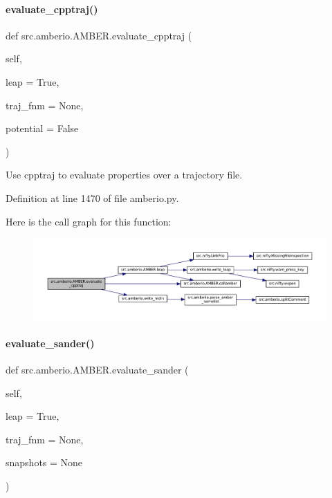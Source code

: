 \paragraph{\texorpdfstring{evaluate\+\_\+cpptraj()}{evaluate\_cpptraj()}}
{\footnotesize\ttfamily def src.\+amberio.\+A\+M\+B\+E\+R.\+evaluate\+\_\+cpptraj (\begin{DoxyParamCaption}\item[{}]{self,  }\item[{}]{leap = {\ttfamily True},  }\item[{}]{traj\+\_\+fnm = {\ttfamily None},  }\item[{}]{potential = {\ttfamily False} }\end{DoxyParamCaption})}



Use cpptraj to evaluate properties over a trajectory file. 



Definition at line 1470 of file amberio.\+py.

Here is the call graph for this function\+:
\nopagebreak
\begin{figure}[H]
\begin{center}
\leavevmode
\includegraphics[width=350pt]{classsrc_1_1amberio_1_1AMBER_aebf6805d55d195578926031a77282daf_cgraph}
\end{center}
\end{figure}
\mbox{\label{classsrc_1_1amberio_1_1AMBER_aaa5d9969b50621ec9288caf56d45c3d2}} 
\paragraph{\texorpdfstring{evaluate\+\_\+sander()}{evaluate\_sander()}}
{\footnotesize\ttfamily def src.\+amberio.\+A\+M\+B\+E\+R.\+evaluate\+\_\+sander (\begin{DoxyParamCaption}\item[{}]{self,  }\item[{}]{leap = {\ttfamily True},  }\item[{}]{traj\+\_\+fnm = {\ttfamily None},  }\item[{}]{snapshots = {\ttfamily None} }\end{DoxyParamCaption})}



